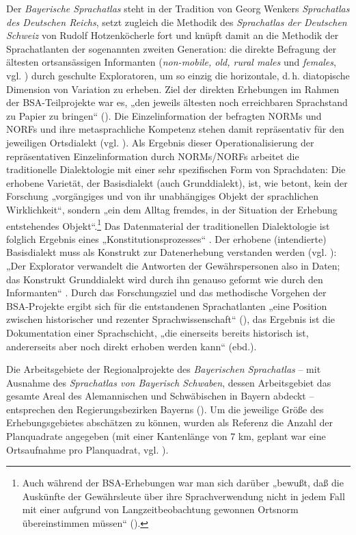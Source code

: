 Der \textit{Bayerische Sprachatlas} steht in der Tradition von Georg Wenkers \textit{Sprachatlas des Deutschen Reichs}, setzt zugleich die Methodik des \textit{Sprachatlas der Deutschen Schweiz} von Rudolf Hotzenköcherle fort und knüpft damit an die Methodik der Sprachatlanten der sogenannten zweiten Generation: die direkte Befragung der ältesten ortsansässigen Informanten (\textit{non-mobile, old, rural males} und \textit{females}, vgl. \citealt[29]{ChambersTrudgill2009}) durch geschulte Exploratoren, um so einzig die horizontale, d.\,h. diatopische Dimension von Variation zu erheben. Ziel der direkten Erhebungen im Rahmen der BSA-Teilprojekte war es, „den jeweils ältesten noch erreichbaren Sprachstand zu Papier zu bringen“ (\citealt[25]{SBS1}). Die Einzelinformation der befragten NORMs und NORFs und ihre metasprachliche Kompetenz stehen damit repräsentativ für den jeweiligen Ortsdialekt (vgl. \citealt[500--501]{König2010}). Als Ergebnis dieser Operationalisierung der repräsentativen Einzelinformation durch NORMs/NORFs arbeitet die traditionelle Dialektologie mit einer sehr spezifischen Form von Sprachdaten: Die erhobene Varietät, der Basisdialekt (auch Grunddialekt), ist, wie \citet[24f.]{Auer2010} betont, kein der Forschung „vorgängiges und von ihr unabhängiges Objekt der sprachlichen Wirklichkeit“, sondern „ein dem Alltag fremdes, in der Situation der Erhebung entstehendes Objekt“.\footnote{Auch während der BSA-Erhebungen war man sich darüber „bewußt, daß die Auskünfte der Gewährsleute über ihre Sprachverwendung nicht in jedem Fall mit einer aufgrund von Langzeitbeobachtung gewonnen Ortsnorm übereinstimmen müssen“ (\citealt[26]{SBS1}).} Das Datenmaterial der traditionellen Dialektologie ist folglich Ergebnis eines „Konstitutionsprozesses“ \citep{Auer2010}. Der erhobene (intendierte) Basisdialekt muss als Konstrukt zur Datenerhebung verstanden werden (vgl. \citealt[502]{König2010}): „Der Explorator verwandelt die Antworten der Gewährspersonen also in Daten; das Konstrukt Grunddialekt wird durch ihn genauso geformt wie durch den Informanten“ \citep[34]{Auer2010}. Durch das Forschungsziel und das methodische Vorgehen der BSA-Projekte ergibt sich für die entstandenen Sprachatlanten „eine Position zwischen historischer und rezenter Sprachwissenschaft“ (\citealt[37]{SMF1}), das Ergebnis ist die Dokumentation einer Sprachschicht, „die einerseits bereits historisch ist, andererseits aber noch direkt erhoben werden kann“ (ebd.).

Die Arbeitsgebiete der Regionalprojekte des \textit{Bayerischen Sprachatlas} -- mit Ausnahme des \textit{Sprachatlas von Bayerisch Schwaben}, dessen Arbeitsgebiet das gesamte Areal des Alemannischen und Schwäbischen in Bayern abdeckt -- entsprechen den Regierungsbezirken Bayerns (). Um die jeweilige Größe des Erhebungsgebietes abschätzen zu können, wurden als Referenz die Anzahl der Planquadrate angegeben (mit einer Kantenlänge von 7 km, geplant war eine Ortsaufnahme pro Planquadrat, vgl. \citealt[21]{Klepsch2013}).

